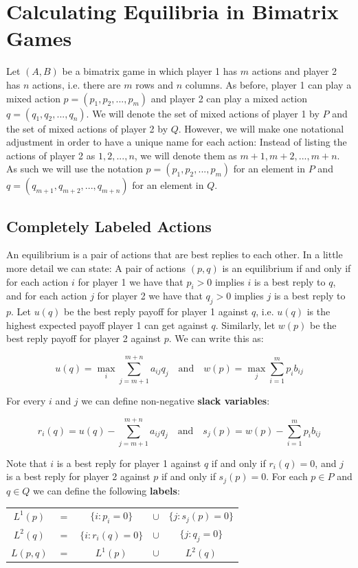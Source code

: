 \documentclass[12pt]{article}
\begin{document}
\section{Calculating Equilibria in Bimatrix Games}
Let $(A, B)$ be a bimatrix game in which player 1 has $m$ actions and player 2 has $n$ actions, i.e. there are $m$ rows and $n$ columns.
As before, player 1 can play a mixed action $p = (p_1, p_2, ... , p_m)$ and player 2 can play a mixed action $q = (q_1, q_2, ... , q_n)$.
We will denote the set of mixed actions of player 1 by $P$ and the set of mixed actions of player 2 by $Q$.
However, we will make one notational adjustment in order to have a unique name for each action:
Instead of listing the actions of player 2 as $1, 2, ... , n$, we will denote them as $m + 1, m + 2, ... , m + n$.
As such we will use the notation $p = (p_1, p_2, ... , p_m)$ for an element in $P$ and $q = (q_{m + 1}, q_{m + 2}, ... , q_{m + n})$ for an element in $Q$.

\subsection{Completely Labeled Actions}
An equilibrium is a pair of actions that are best replies to each other.
In a little more detail we can state:
A pair of actions $(p, q)$ is an equilibrium if and only if for each action $i$ for player 1 we have that $p_i > 0$ implies $i$ is a best reply to $q$, and for each action $j$ for player 2 we have that $q_j > 0$ implies $j$ is a best reply to $p$.
Let $u(q)$ be the best reply payoff for player 1 against $q$, i.e. $u(q)$ is the highest expected payoff player 1 can get against $q$.
Similarly, let $w(p)$ be the best reply payoff for player 2 against $p$.
We can write this as:

\[ u(q) = \max_i \sum_{j = m + 1}^{m + n} a_{ij} q_j \quad \text{and} \quad w(p) = \max_j \sum_{i = 1}^{m} p_i b_{ij} \]

\noindent
For every $i$ and $j$ we can define non-negative \textbf{slack variables}:

\[ r_i(q) = u(q) - \sum_{j = m + 1}^{m + n} a_{ij} q_j \quad \text{and} \quad s_j(p) = w(p) - \sum_{i = 1}^{m} p_i b_{ij} \]

\noindent
Note that $i$ is a best reply for player 1 against $q$ if and only if $r_i(q) = 0$, and $j$ is a best reply for player 2 against $p$ if and only if $s_j(p) = 0$.
For each $p \in P$ and $q \in Q$ we can define the following \textbf{labels}:

\begin{table}[h]
    \centering
    \begin{tabular}{ccccc}
    $L^1(p)$ & $=$ & $\{ i : p_i = 0 \}$ & $\cup$ & $\{ j : s_j(p) = 0 \}$ \\
    $L^2(q)$ & $=$ & $\{ i : r_i(q) = 0 \}$ & $\cup$ & $\{ j : q_j = 0 \}$ \\
    $L(p, q)$ & $=$ & $L^1(p)$ & $\cup$ & $L^2(q)$
    \end{tabular}
\end{table}
\end{document}
